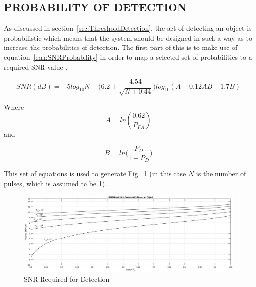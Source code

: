 \documentclass[11pt]{witseiepaper}
\begin{document}
\begin{bibunit}[witseie]
\section{PROBABILITY OF DETECTION} \label{sec:SNRProbability}
As discussed in section~\ref{sec:ThresholdDetection}, the act of detecting an object is probabilistic which means that the system should be designed in such a way as to increase the probabilities of detection. 
The first part of this is to make use of equation~\ref{eqn:SNRProbability} in order to map a selected set of probabilities to a required SNR value \cite[p.~107]{radarHandbook}.

\begin{equation} \label{eqn:SNRProbability}
SNR (dB) = -5 log_{10}N + \Bigg(6.2 + \frac{4.54}{\sqrt{N + 0.44}}\Bigg) log_{10}(A + 0.12 A B + 1.7 B)
\end{equation}

Where 
\begin{equation} \label{eqn:A}
A = ln(\frac{0.62}{P_{FA}})
\end{equation}
and 

\begin{equation} \label{eqn:B}
B = ln \Bigg( \frac{P_D}{1 - P_D} \Bigg)
\end{equation}

This set of equations is used to generate Fig.~\ref{fig:SNRRequired} (in this case $N$ is the number of pulses, which is assumed to be 1).

\begin{center}
    \begin{figure}
        \includegraphics[width=\textwidth]{ProbabilityDetection.eps}
        \caption{SNR Required for Detection}
        \label{fig:SNRRequired}    
    \end{figure}
\end{center}


\end{bibunit}
\end{document}
